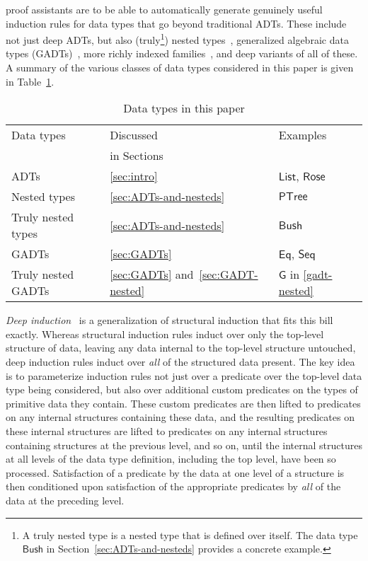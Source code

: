 \documentclass[sigplan,screen]{acmart}
\begin{document}
proof assistants are to be
able to automatically generate genuinely useful induction rules for
data types that go
beyond traditional ADTs. These
include not just deep ADTs, but also (truly\footnote{A truly nested
  type is a nested type that is defined over itself. The data type
  $\mathsf{Bush}$ in Section~\ref{sec:ADTs-and-nesteds} provides a
  concrete example.}) nested types~\cite{bm98},
generalized algebraic data types
(GADTs)~\cite{ch03,pvww06,sp04,xcc03}, more richly indexed
families~\cite{dyb94}, and deep variants of all of these. A summary of
the various classes of data types considered in this paper is given in
Table~\ref{fig:taxonomy}.

\begin{table}[h!]
\begin{tabular}{|l|l|l|}
\hline
Data types & Discussed & Examples \\
          & in Sections &          \\
\hline\hline
ADTs & \ref{sec:intro} &
$\mathsf{List}$, $\mathsf{Rose}$ \\ 
Nested types & \ref{sec:ADTs-and-nesteds} & $\mathsf{PTree}$ \\  
Truly nested types & \ref{sec:ADTs-and-nesteds} & $\mathsf{Bush}$\\
GADTs & \ref{sec:GADTs} & $\mathsf{Eq}$, $\mathsf{Seq}$\\
Truly nested GADTs & \ref{sec:GADTs} and~\ref{sec:GADT-nested}&
$\mathsf{G}$ in \eqref{gadt-nested}\\ 
\hline
\end{tabular}
\caption{Data types in this paper}\label{fig:taxonomy}
\end{table}

{\em Deep induction}~\cite{jp20} is a generalization of structural
induction that fits this bill exactly. Whereas structural induction
rules induct over only the top-level structure of data, leaving any
data internal to the top-level structure untouched, deep induction
rules induct over {\em all} of the structured data present. The key
idea is to parameterize induction rules not just over a predicate over
the top-level data type being considered, but also over additional
custom predicates on the types of primitive data they contain. These
custom predicates are then lifted to predicates on any internal
structures containing these data, and the resulting predicates on
these internal structures are lifted to predicates on any internal
structures containing structures at the previous level, and so on,
until the internal structures at all levels of the data type
definition, including the top level, have been so
processed. Satisfaction of a predicate by the data at one level of a
structure is then conditioned upon satisfaction of the appropriate
predicates by {\em all} of the data at the preceding level.
\end{document}

